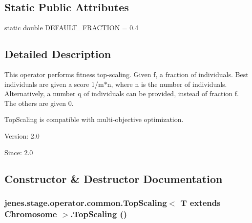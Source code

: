 \subsection*{Static Public Attributes}
\begin{CompactItemize}
\item 
static double \hyperlink{classjenes_1_1stage_1_1operator_1_1common_1_1_top_scaling_3_01_t_01extends_01_chromosome_01_4_f21f9346a23ebaab4d7a5bd4367edafe}{DEFAULT\_\-FRACTION} = 0.4
\end{CompactItemize}


\subsection{Detailed Description}
This operator performs fitness top-scaling. Given f, a fraction of individuals. Best individuals are given a score 1/m$\ast$n, where n is the number of individuals. Alternatively, a number q of individuals can be provided, instead of fraction f. The others are given 0. 

TopScaling is compatible with multi-objective optimization.

\begin{Desc}
\item[Version:]2.0 \end{Desc}
\begin{Desc}
\item[Since:]2.0 \end{Desc}


\subsection{Constructor \& Destructor Documentation}
\hypertarget{classjenes_1_1stage_1_1operator_1_1common_1_1_top_scaling_3_01_t_01extends_01_chromosome_01_4_a1be76204f86d57efff77e708cbcf2f9}{
\subsubsection[TopScaling]{\setlength{\rightskip}{0pt plus 5cm}jenes.stage.operator.common.TopScaling$<$ T extends Chromosome $>$.TopScaling ()}}
\label{classjenes_1_1stage_1_1operator_1_1common_1_1_top_scaling_3_01_t_01extends_01_chromosome_01_4_a1be76204f86d57efff77e708cbcf2f9}


